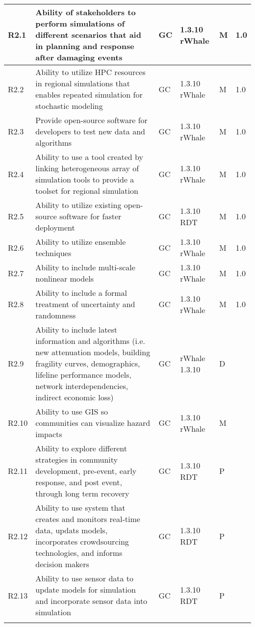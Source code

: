 \begin{longtable}{|  C{.07\textwidth} | p{.5\textwidth} | C{.08\textwidth} | C{.09\textwidth} | C{.08\textwidth} | C{.08\textwidth} |}
R2.1 & Ability of stakeholders to perform simulations of different scenarios that aid in planning and response after damaging events & GC & 1.3.10 rWhale & M & 1.0 \\ \hline
R2.2 &  Ability to utilize HPC resources in regional simulations that enables repeated simulation for stochastic modeling & GC & 1.3.10 rWhale & M & 1.0 \\ \hline
R2.3 &  Provide open-source software for developers to test new data and algorithms & GC & 1.3.10 rWhale & M & 1.0  \\ \hline
R2.4 & Ability to use a tool created by linking heterogeneous array of simulation tools to provide a toolset for regional simulation & GC & 1.3.10 rWhale & M & 1.0 \\ \hline
R2.5 &  Ability to utilize existing open-source software for faster deployment & GC & 1.3.10 RDT & M & 1.0 \\ \hline
R2.6 &  Ability to utilize ensemble techniques  & GC & 1.3.10 rWhale & M & 1.0 \\ \hline
R2.7  & Ability to include multi-scale nonlinear models & GC & 1.3.10 rWhale & M & 1.0 \\ \hline
R2.8 & Ability to include a formal treatment of uncertainty and randomness & GC & 1.3.10 rWhale & M & 1.0 \\ \hline
R2.9 & Ability to include latest information and algorithms (i.e. new attenuation models, building fragility curves, demographics, lifeline performance models, network interdependencies, indirect economic loss)
& GC & rWhale 1.3.10 & D & \\ \hline
R2.10 &  Ability to use GIS so communities can visualize hazard impacts & GC & 1.3.10 rWhale & M & \\ \hline
R2.11 &  Ability to explore different strategies in community development, pre-event, early response, and post event, through long term recovery & GC & 1.3.10 RDT & P & \\ \hline
R2.12 &  Ability to use system that creates and monitors real-time data, updats models, incorporates crowdsourcing technologies, and informs decision makers & GC & 1.3.10 RDT & P & \\ \hline
R2.13 &  Ability to use sensor data to update models for simulation and incorporate sensor data into simulation & GC & 1.3.10 RDT & P & \\  \hhline{======}




\end{longtable}
